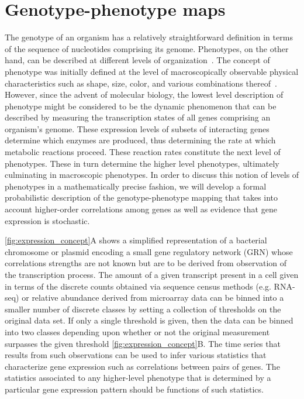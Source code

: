 
\section{Genotype-phenotype maps}
The genotype of an organism has a relatively straightforward definition in terms of the sequence of nucleotides comprising its genome. Phenotypes, on the other hand, can be described at different levels of organization~\cite{Dawkins1982,Stadler2001}. The concept of phenotype was initially defined at the level of macroscopically observable physical characteristics such as shape, size, color, and various combinations thereof~\cite{Johannsen1911}. However, since the advent of molecular biology, the lowest level description of phenotype might be considered to be the dynamic phenomenon that can be described by measuring the transcription states of all genes comprising an organism's genome.  These expression levels of subsets of interacting genes determine which enzymes are produced, thus determining the rate at which metabolic reactions proceed.  These reaction rates constitute the next level of phenotypes.  These in turn determine the higher level phenotypes, ultimately culminating in macroscopic phenotypes.  In order to discuss this notion of levels of phenotypes in a mathematically precise fashion, we will develop a formal probabilistic description of the genotype-phenotype mapping that takes into account higher-order correlations among genes as well as evidence that gene expression is stochastic.

\ref{fig:expression_concept}A shows a simplified representation of a bacterial chromosome or plasmid encoding a small gene regulatory network (GRN) whose correlations strengths are not known but are to be derived from observation of the transcription process. The amount of a given transcript present in a cell given in terms of the discrete counts obtained via sequence census methods (e.g. RNA-seq) or relative abundance derived from microarray data can be binned into a smaller number of discrete classes by setting a collection of thresholds on the original data set. If only a single threshold is given, then the data can be binned into two classes depending upon whether or not the original measurement surpasses the given threshold \ref{fig:expression_concept}B.
The time series that results from such observations can be used to infer various statistics that characterize gene expression such as correlations between pairs of genes. The statistics associated to any higher-level phenotype that is determined by a particular gene expression pattern should be functions of such statistics.

